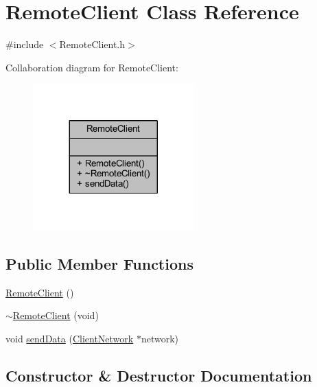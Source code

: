 \hypertarget{class_remote_client}{}\section{Remote\+Client Class Reference}
\label{class_remote_client}


{\ttfamily \#include $<$Remote\+Client.\+h$>$}



Collaboration diagram for Remote\+Client\+:
\nopagebreak
\begin{figure}[H]
\begin{center}
\leavevmode
\includegraphics[width=176pt]{class_remote_client__coll__graph}
\end{center}
\end{figure}
\subsection*{Public Member Functions}
\begin{DoxyCompactItemize}
\item 
\mbox{\hyperlink{class_remote_client_a9f27a8159622543fec678e4ef22293f8}{Remote\+Client}} ()
\item 
\mbox{\hyperlink{class_remote_client_a87d5a85c578795507d3bf2471e7c183f}{$\sim$\+Remote\+Client}} (void)
\item 
void \mbox{\hyperlink{class_remote_client_af16d324aebfc6e2ed5718bbcb0f78e24}{send\+Data}} (\mbox{\hyperlink{class_client_network}{Client\+Network}} $\ast$network)
\end{DoxyCompactItemize}


\subsection{Constructor \& Destructor Documentation}
\mbox{\label{class_remote_client_a9f27a8159622543fec678e4ef22293f8}} 
